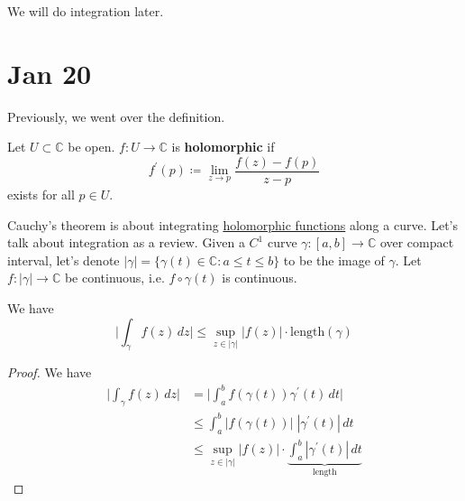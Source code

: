 	We will do integration later. 

\section{Jan 20}

	Previously, we went over the definition. 

	\begin{definition}
	  \label{def:holomorphic-function-3}
		Let $U \subset \mathbb{C}$ be open. $f: U \to \mathbb{C}$ is \textbf{holomorphic} if 
		\begin{equation}
			f^\prime (p) \coloneqq \lim_{z \to p} \frac{f(z) - f(p)}{z - p}
		\end{equation} 
		exists for all $p \in U$. 
	\end{definition}

	Cauchy's theorem is about integrating \hyperref[def:holomorphic-function-3]{holomorphic functions} along a curve. Let's talk about integration as a review. Given a $C^1$ curve $\gamma: [a, b] \to \mathbb{C}$ over compact interval, let's denote $|\gamma| = \{\gamma(t) \in \mathbb{C} \colon a \leq t \leq b \}$ to be the image of $\gamma$. Let $f: |\gamma| \to \mathbb{C}$ be continuous, i.e. $f \circ \gamma  (t)$ is continuous. 

	\begin{theorem}
	  \label{thm:mean-length-inequality}
	  We have 
		\begin{equation}
			\bigg| \int_{\gamma} f(z) \,dz \bigg| \leq \sup_{z \in |\gamma|} |f(z)| \cdot \text{length}(\gamma)
		\end{equation}
	\end{theorem}
	\begin{proof}
	  We have 
		\begin{align}
			\bigg| \int_{\gamma} f(z) \,dz \bigg| & = \bigg| \int_a^b f(\gamma(t)) \gamma^\prime (t) \,dt \bigg| \\ 
																						& \leq \int_a^b |f(\gamma(t))| \; |\gamma^\prime (t)| \,dt \\ 
																						& \leq \sup_{z \in |\gamma|} |f(z)| \cdot \underbrace{\int_a^b |\gamma^\prime (t)| \,dt}_{\text{length}}
		\end{align}
	\end{proof}

